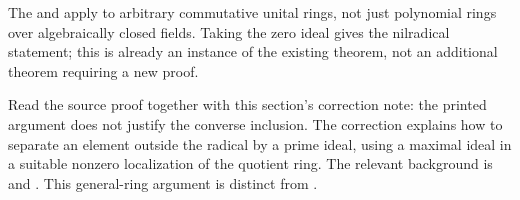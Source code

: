 \begin{remark}\label{remark-radical-definition-and-proof}
The  and  apply to arbitrary commutative unital rings, not just polynomial rings over algebraically closed fields. Taking the zero ideal gives the nilradical statement; this is already an instance of the existing theorem, not an additional theorem requiring a new proof.

Read the source proof together with this section's correction note: the printed argument does not justify the converse inclusion. The correction explains how to separate an element outside the radical by a prime ideal, using a maximal ideal in a suitable nonzero localization of the quotient ring. The relevant background is  and . This general-ring argument is distinct from .
\end{remark}
